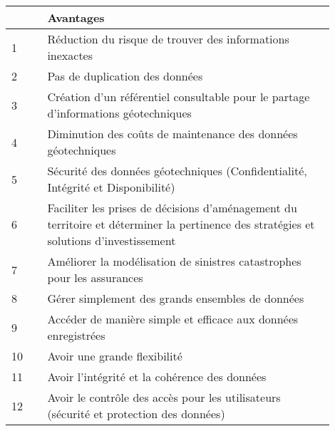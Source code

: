 \par    
\begin{table}
        \centering
        \begin{tabular}{|p{0.10\linewidth}|p{0.80\linewidth}|}
        \hline
                \textbf{ } & \textbf{Avantages} \\
                \hline
                    1 &
                    Réduction du risque de trouver des informations inexactes
                    \\
                \hline 
                    2 &
                    Pas de duplication des données
                    \\
                \hline 
                    3 &
                    Création d'un référentiel consultable pour le partage d’informations géotechniques
                    \\
                \hline 
                    4 &
                    Diminution des coûts de maintenance des données géotechniques
                    \\
                \hline 
                    5 &
                    Sécurité des données géotechniques (Confidentialité, Intégrité et Disponibilité)
                    \\
                \hline 
                    6 &
                    Faciliter les prises de décisions d’aménagement du territoire 
                    et déterminer la pertinence des stratégies et solutions d’investissement
                    \\
                \hline 
                    7 &
                    Améliorer la modélisation de sinistres catastrophes pour les assurances
                    \\
                \hline 
                    8 &
                    Gérer simplement des grands ensembles de données
                    \\
                \hline 
                    9 &
                    Accéder de manière simple et efficace aux données enregistrées
                    \\
                \hline 
                    10 &
                    Avoir une grande flexibilité
                    \\
                \hline 
                    11 &
                    Avoir l'intégrité et la cohérence des données
                    \\
                \hline 
                    12 &
                    Avoir le contrôle des accès pour les utilisateurs (sécurité et protection des données)

\end{tabular}
\end{table}
